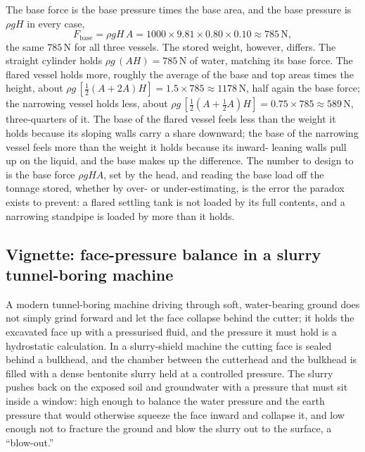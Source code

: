 The base force is the base pressure times the base area, and the base
pressure is $\rho g H$ in every case,
\[
F_{\text{base}} = \rho g H\, A
= 1000 \times 9.81 \times 0.80 \times 0.10
\approx 785\,\text{N},
\]
the same $785\,\text{N}$ for all three vessels. The stored weight, however,
differs. The straight cylinder holds $\rho g\,(A H) = 785\,\text{N}$ of
water, matching its base force. The flared vessel holds more, roughly the
average of the base and top areas times the height, about $\rho g\,
[\tfrac12(A + 2A)H] = 1.5 \times 785 \approx 1178\,\text{N}$, half again the
base force; the narrowing vessel holds less, about $\rho g\,[\tfrac12(A +
\tfrac12 A)H] = 0.75 \times 785 \approx 589\,\text{N}$, three-quarters of
it. The base of the flared vessel feels less than the weight it holds
because its sloping walls carry a share downward; the base of the
narrowing vessel feels more than the weight it holds because its inward-
leaning walls pull up on the liquid, and the base makes up the difference.
The number to design to is the base force $\rho g H A$, set by the head, and
reading the base load off the tonnage stored, whether by over- or
under-estimating, is the error the paradox exists to prevent: a flared
settling tank is not loaded by its full contents, and a narrowing standpipe
is loaded by more than it holds.

\subsection{Vignette: face-pressure balance in a slurry tunnel-boring machine}

A modern tunnel-boring machine driving through soft, water-bearing ground
does not simply grind forward and let the face collapse behind the cutter;
it holds the excavated face up with a pressurised fluid, and the pressure
it must hold is a hydrostatic calculation. In a slurry-shield machine the
cutting face is sealed behind a bulkhead, and the chamber between the
cutterhead and the bulkhead is filled with a dense bentonite slurry held at
a controlled pressure. The slurry pushes back on the exposed soil and
groundwater with a pressure that must sit inside a window: high enough to
balance the water pressure and the earth pressure that would otherwise
squeeze the face inward and collapse it, and low enough not to fracture the
ground and blow the slurry out to the surface, a ``blow-out.''

